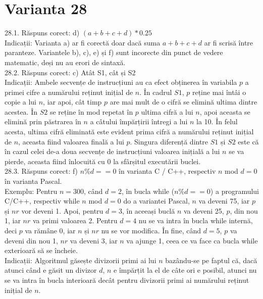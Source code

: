 \section*{Varianta 28}

28.1. Răspuns corect: d) $(a+b+c+d) * 0.25$\\
Indicații: Varianta a) ar fi corectă doar dacă suma $a+b+c+d$ ar fi scrisă între paranteze. Variantele b), c), e) și f) sunt incorecte din punct de vedere matematic, deși nu au erori de sintaxă.\\

28.2. Răspuns corect: c) Atât S1, cât și S2\\
Indicații: Ambele secvențe de instrucțiuni au ca efect obținerea în variabila $p$ a primei cifre a numărului reținut inițial de $n$. În cadrul $S1$, $p$ reține mai întâi o copie a lui $n$, iar apoi, cât timp $p$ are mai mult de o cifră se elimină ultima dintre acestea. În $S2$ se reține în mod repetat în $p$ ultima cifră a lui $n$, apoi aceasta se elimină prin păstrarea în $n$ a câtului împărțirii întregi a lui $n$ la 10. În felul acesta, ultima cifră eliminată este evident prima cifră a numărului reținut inițial de $n$, aceasta fiind valoarea finală a lui $p$. Singura diferență dintre $S1$ și $S2$ este că în cazul celei de-a doua secvențe de instrucțiuni valoarea inițială a lui $n$ se va pierde, aceasta fiind înlocuită cu 0 la sfârșitul executării buclei.\\

28.3. Răspuns corect: f) $n \% d==0$ în varianta C / C++, respectiv $n$ mod $d=0$ în varianta Pascal.\\
Exemplu: Pentru $n=300$, când $d=2$, în bucla while ($n \% d==0$) a programului C/C++, respectiv while $n$ mod $d=0$ do a variantei Pascal, $n$ va deveni 75, iar $p$ și $nr$ vor deveni 1. Apoi, pentru $d=3$, în aceeași buclă $n$ va deveni 25, $p$, din nou 1, iar $nr$ va primi valoarea 2. Pentru $d=4$ nu se va intra în bucla while internă, deci $p$ va rămâne 0, iar $n$ și $nr$ nu se vor modifica. În fine, când $d=5$, $p$ va deveni din nou 1, $nr$ va deveni 3, iar $n$ va ajunge 1, ceea ce va face ca bucla while exterioară să se încheie.\\ Indicații: Algoritmul găsește divizorii primi ai lui $n$ bazându-se pe faptul că, dacă atunci când e găsit un divizor $d$, $n$ e împărțit la el de câte ori e posibil, atunci nu se va intra în bucla interioară decât pentru divizorii primi ai numărului reținut inițial de $n$.\\

